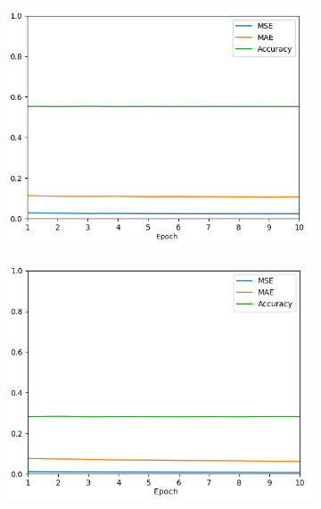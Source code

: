 \documentclass[conference]{IEEEtran}
\begin{document}
\begin{figure}[h]
	\centering
	\begin{subfigure}{0.24\textwidth} 
		\includegraphics[width=\textwidth]{img/pilotnet1}
		\label{subfig:1}
	\end{subfigure}
	\begin{subfigure}{0.24\textwidth} 
		\includegraphics[width=\textwidth]{img/pilotnet2}
		\label{subfig:2}
	\end{subfigure}
	\begin{subfigure}{0.24\textwidth} 

\end{subfigure}
\end{figure}
\end{document}
